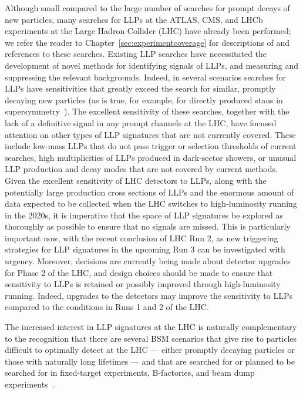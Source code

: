 Although small compared to the large number of searches for prompt decays of new particles, many searches for LLPs at the ATLAS, CMS, and LHCb experiments at the Large Hadron Collider (LHC) have already been performed; we refer the reader to Chapter~\ref{sec:experimentcoverage} for descriptions of and references to these searches. Existing LLP searches have necessitated the development of novel methods for identifying signals of LLPs, and measuring and suppressing the relevant backgrounds.
Indeed, in several scenarios searches for LLPs have sensitivities that greatly exceed the search for similar, promptly decaying new particles (as is true, for example, for directly produced staus in supersymmetry~\cite{CMS-PAS-EXO-16-036}).
The excellent sensitivity of these searches, together with the lack of a definitive signal in any prompt channels at the LHC, have focused attention on other types of LLP signatures that are not currently covered.
These include low-mass LLPs that do not pass trigger or selection thresholds of current searches, high multiplicities of LLPs produced in dark-sector showers, or unusual LLP production and decay modes that are not covered by current methods.
Given the excellent sensitivity of LHC detectors to LLPs, along with the potentially large production cross sections of LLPs and the enormous amount of data expected to be collected when the LHC switches to high-luminosity running in the 2020s, it is imperative that the space of LLP signatures be explored as thoroughly as possible to ensure that no signals are missed.
This is particularly important now, with the recent conclusion of LHC Run 2, as new triggering strategies for LLP signatures in the upcoming Run 3 can be investigated with urgency.
Moreover, decisions are currently being made about detector upgrades for Phase 2 of the LHC, and design choices should be made to ensure that sensitivity to LLPs is retained or possibly improved through high-luminosity running.
Indeed, upgrades to the detectors may improve the sensitivity to LLPs compared to the conditions in Runs 1 and 2 of the LHC.

The increased interest in LLP signatures at the LHC is naturally complementary to the recognition that there are several BSM scenarios that give rise to particles difficult to optimally detect at the LHC --- either promptly decaying particles or those with naturally long lifetimes --- and that are searched for or planned to be searched for in fixed-target experiments, B-factories, and beam dump experiments~\cite{Alexander:2016aln,Battaglieri:2017aum,Beacham:2019nyx}.

